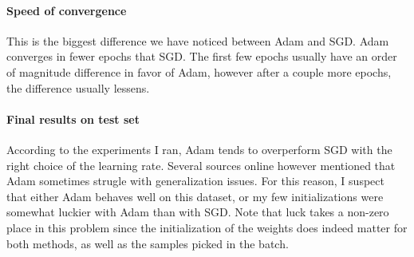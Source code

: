 \documentclass[12pt]{article}
\begin{document}
\paragraph{Speed of convergence}
This is the biggest difference we have noticed between Adam and SGD. Adam converges in fewer epochs that SGD. The first few epochs usually have an order of magnitude difference in favor of Adam, however after a couple more epochs, the difference usually lessens.
\paragraph{Final results on test set}
According to the experiments I ran, Adam tends to overperform SGD with the right choice of the learning rate. Several sources online however mentioned that Adam sometimes strugle with generalization issues. For this reason, I suspect that either Adam behaves well on this dataset, or my few initializations were somewhat luckier with Adam than with SGD. Note that luck takes a non-zero place in this problem since the initialization of the weights does indeed matter for both methods, as well as the samples picked in the batch.


\newpage
\appendix
\end{document}
